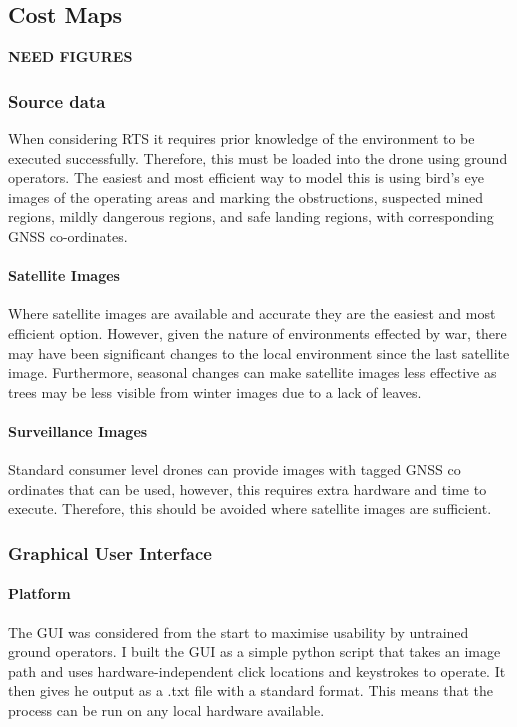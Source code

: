 \subsection{Cost Maps}
\textbf{NEED FIGURES}
\subsubsection{Source data}
When considering \gls{RTS} it requires prior knowledge of the environment to be executed successfully. Therefore, this must be loaded into the drone using ground operators. The easiest and most efficient way to model this is using bird's eye images of the operating areas and marking the obstructions, suspected mined regions, mildly dangerous regions, and safe landing regions, with corresponding \gls{GNSS} co-ordinates.
\paragraph{Satellite Images}
Where satellite images are available and accurate they are the easiest and most efficient option. However, given the nature of environments effected by war, there may have been significant changes to the local environment since the last satellite image. Furthermore, seasonal changes can make satellite images less effective as trees may be less visible from winter images due to a lack of leaves.
\paragraph{Surveillance Images}
Standard consumer level drones can provide images with tagged \gls{GNSS} co ordinates that can be used, however, this requires extra hardware and time to execute. Therefore, this should be avoided where satellite images are sufficient.

\subsubsection{Graphical User Interface}
\paragraph{Platform} 
The \gls{GUI} was considered from the start to maximise usability by untrained ground operators. I built the \gls{GUI} as a simple python script that takes an image path and uses hardware-independent click locations and keystrokes to operate. It then gives he output as a .txt file with a standard format. This means that the process can be run on any local hardware available.

